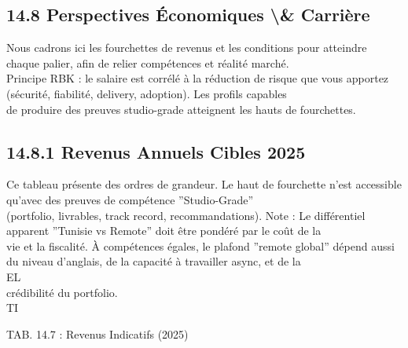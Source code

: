 \subsection{14.8 Perspectives Économiques \textbackslash{}& Carrière}
Nous cadrons ici les fourchettes de revenus et les conditions pour atteindre chaque palier, afin de relier compétences et réalité marché.\\
Principe RBK : le salaire est corrélé à la réduction de risque que vous apportez (sécurité, fiabilité, delivery, adoption). Les profils capables\\
de produire des preuves studio-grade atteignent les hauts de fourchettes.\\
\vspace{0.5em}
\vspace{0.5em}
\subsection{14.8.1 Revenus Annuels Cibles 2025}
Ce tableau présente des ordres de grandeur. Le haut de fourchette n’est accessible qu’avec des preuves de compétence ”Studio-Grade”\\
(portfolio, livrables, track record, recommandations). Note : Le différentiel apparent ”Tunisie vs Remote” doit être pondéré par le coût de la\\
vie et la fiscalité. À compétences égales, le plafond ”remote global” dépend aussi du niveau d’anglais, de la capacité à travailler async, et de la\\
\vspace{0.5em}
\vspace{0.5em}
\vspace{0.5em}
\vspace{0.5em}
EL\\
crédibilité du portfolio.\\
\vspace{0.5em}
\vspace{0.5em}
\vspace{0.5em}
\vspace{0.5em}
TI\\
\begin{center}\begin{tabular}TAB. 14.7 : Revenus Indicatifs (2025)\end{tabular}\end{center}
\vspace{0.5em}
\vspace{0.5em}
\vspace{0.5em}
\vspace{0.5em}
